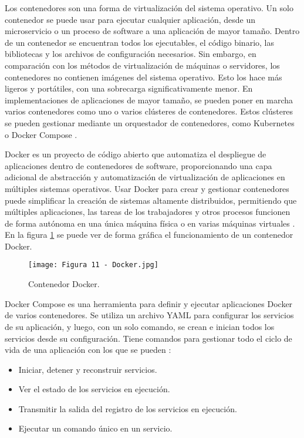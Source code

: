 Los contenedores son una forma de virtualización del sistema operativo. Un solo contenedor se puede usar para ejecutar cualquier aplicación, desde un microservicio o un proceso de software a una aplicación de mayor tamaño. Dentro de un contenedor se encuentran todos los ejecutables, el código binario, las bibliotecas y los archivos de configuración necesarios. Sin embargo, en comparación con los métodos de virtualización de máquinas o servidores, los contenedores no contienen imágenes del sistema operativo. Esto los hace más ligeros y portátiles, con una sobrecarga significativamente menor. En implementaciones de aplicaciones de mayor tamaño, se pueden poner en marcha varios contenedores como uno o varios clústeres de contenedores. Estos clústeres se pueden gestionar mediante un orquestador de contenedores, como Kubernetes o Docker Compose \citep{28}.

Docker es un proyecto de código abierto que automatiza el despliegue de aplicaciones dentro de contenedores de software, proporcionando una capa adicional de abstracción y automatización de virtualización de aplicaciones en múltiples sistemas operativos. Usar Docker para crear y gestionar contenedores puede simplificar la creación de sistemas altamente distribuidos, permitiendo que múltiples aplicaciones, las tareas de los trabajadores y otros procesos funcionen de forma autónoma en una única máquina física o en varias máquinas virtuales \citep{29}. En la figura \ref{fig:11} se puede ver de forma gráfica el funcionamiento de un contenedor Docker.

\begin{figure}[h]
\centering
\texttt{[image: Figura 11 - Docker.jpg]}
\caption[Docker]{Contenedor Docker. \footnotemark}
\label{fig:11}
\end{figure}

Docker Compose es una herramienta para definir y ejecutar aplicaciones Docker de varios contenedores. Se utiliza un archivo YAML para configurar los servicios de su aplicación, y luego, con un solo comando, se crean e inician todos los servicios desde su configuración. Tiene comandos para gestionar todo el ciclo de vida de una aplicación con los que se pueden \citep{30}:

\begin{itemize}
	\item Iniciar, detener y reconstruir servicios.
	\item Ver el estado de los servicios en ejecución.
	\item Transmitir la salida del registro de los servicios en ejecución.
	\item Ejecutar un comando único en un servicio.
\end{itemize}
